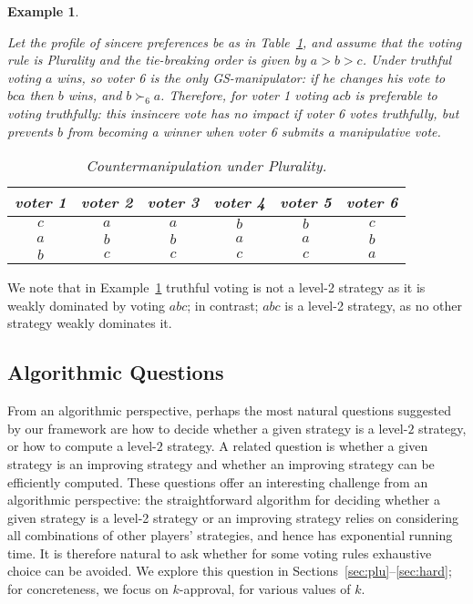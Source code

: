 \documentclass[11pt]{article}
\newtheorem{example}{Example}
\begin{document}
\begin{example}\label{ex:counter}
{\em
Let the profile of sincere preferences be as in Table~\ref{table:example2}, and assume that 
the voting rule is Plurality and the tie-breaking order is given by $a>b>c$. 
Under truthful voting $a$ wins, so voter 6 is the only GS-manipulator: if he changes his vote
to $bca$ then $b$ wins, and $b\succ_6 a$. Therefore, for voter 1 voting $acb$ is preferable to voting truthfully:
this insincere vote has no impact if voter 6 votes truthfully, but prevents $b$ from becoming a winner when voter 6
submits a manipulative vote. 

\begin{table}[h]
\begin{center}
\begin{tabular}{c|c|c|c|c|c}
voter 1&voter 2&voter 3&voter 4 &voter 5 &voter 6\\
\midrule
$c$&$a$&$a$&$b$&$b$&$c$\\
$a$&$b$&$b$&$a$&$a$&$b$\\
$b$&$c$&$c$&$c$&$c$&$a$\\
\end{tabular}
\caption{Countermanipulation under Plurality.}\label{table:example2}
\end{center}
\end{table}
}
\end{example}

We note that in Example~\ref{ex:counter} truthful voting is not a level-2 strategy as it is weakly dominated
by voting $abc$; in contrast; $abc$ is a level-2 strategy, as no other strategy weakly dominates it.


\subsection{Algorithmic Questions}
From an algorithmic perspective, perhaps the most natural questions 
suggested by our framework are how to decide whether a given strategy
is a level-$2$ strategy, or how to compute a level-$2$ strategy.
A related question is whether a given strategy is an improving strategy
and whether an improving strategy can be efficiently computed.
These questions offer an interesting challenge from an algorithmic perspective:
the straightforward algorithm for deciding whether a given strategy is a level-2 strategy
or an improving strategy relies on considering all combinations of other players' strategies,
and hence has exponential running time. It is therefore natural to ask 
whether for some voting rules exhaustive choice can be avoided.
We explore this question in Sections~\ref{sec:plu}--\ref{sec:hard};
for concreteness, we focus on $k$-approval, for various values of $k$.
\end{document}
